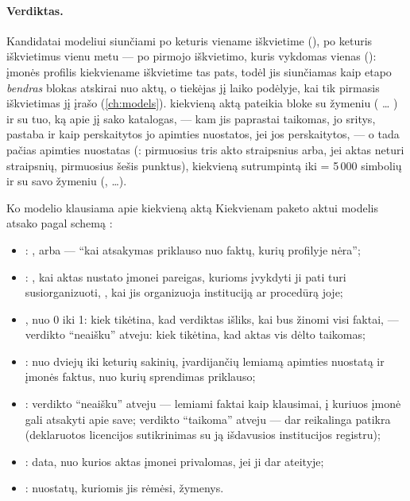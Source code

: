 \paragraph{Verdiktas.} Kandidatai modeliui siunčiami po keturis viename iškvietime
(), po keturis iškvietimus vienu metu --- po pirmojo iškvietimo, kuris
vykdomas vienas (): įmonės profilis kiekviename iškvietime tas pats, todėl
jis siunčiamas kaip etapo \emph{bendras} blokas atskirai nuo aktų, o tiekėjas jį laiko podėlyje,
kai tik pirmasis iškvietimas jį įrašo (\cref{ch:models}).  kiekvieną
aktą pateikia bloke su žymeniu ( \ldots{} ) ir su tuo, ką apie jį sako
katalogas, --- kam jis paprastai taikomas, jo sritys, pastaba ir kaip perskaitytos jo apimties
nuostatos, jei jos perskaitytos, --- o tada pačias apimties nuostatas (:
pirmuosius tris akto straipsnius arba, jei aktas neturi straipsnių, pirmuosius šešis punktus),
kiekvieną sutrumpintą iki  = 5\,000 simbolių ir su savo žymeniu
(, \ldots).

\begin{aibox}{Ko modelio klausiama apie kiekvieną aktą}
Kiekvienam paketo aktui modelis atsako pagal schemą :
\begin{itemize}
  \item {}: ,  arba  ---
    \enquote{kai atsakymas priklauso nuo faktų, kurių profilyje nėra};
  \item {}: , kai aktas nustato įmonei pareigas, kurioms įvykdyti ji
    pati turi susiorganizuoti, , kai jis organizuoja instituciją ar
    procedūrą joje;
  \item {}, nuo 0 iki 1: kiek tikėtina, kad verdiktas išliks, kai bus žinomi visi
    faktai, --- verdikto \enquote{neaišku} atveju: kiek tikėtina, kad aktas vis dėlto taikomas;
  \item {}: nuo dviejų iki keturių sakinių, įvardijančių lemiamą apimties nuostatą
    ir įmonės faktus, nuo kurių sprendimas priklauso;
  \item {}: verdikto \enquote{neaišku} atveju --- lemiami faktai kaip
    klausimai, į kuriuos įmonė gali atsakyti apie save; verdikto \enquote{taikoma} atveju ---
    dar reikalinga patikra (deklaruotos licencijos sutikrinimas su ją išdavusios institucijos
    registru);
  \item {}: data, nuo kurios aktas įmonei privalomas, jei ji dar ateityje;
  \item {}: nuostatų, kuriomis jis rėmėsi, žymenys.
\end{itemize}
\end{aibox}

